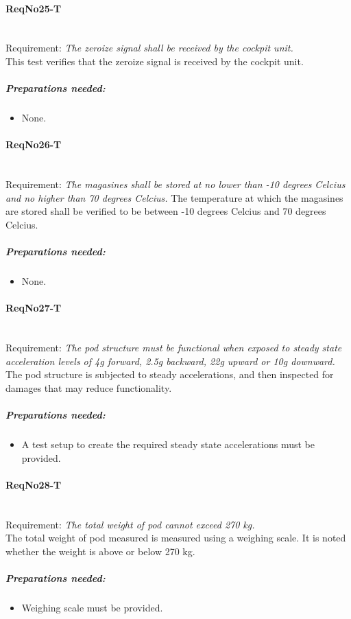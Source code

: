 \paragraph{ReqNo25-T}\mbox{}\\ %
Requirement: \textit{The zeroize signal shall be received by the cockpit unit.}\\

This test verifies that the zeroize signal is received by the cockpit unit.
	\subparagraph{Preparations needed:}
	\begin{itemize}
	\item None.
	\end{itemize}

\paragraph{ReqNo26-T}\mbox{}\\ %
Requirement: \textit{The magasines shall be stored at no lower than -10 degrees Celcius and no higher than 70 degrees Celcius.}
The temperature at which the magasines are stored shall be verified to be between -10 degrees Celcius and 70 degrees Celcius.

	\subparagraph{Preparations needed:}
	\begin{itemize}
	\item None.
	\end{itemize}

\paragraph{ReqNo27-T}\mbox{}\\ %
Requirement: \textit{The pod structure must be functional when exposed to steady state acceleration levels of 4g forward, 2.5g backward, 22g upward or 10g downward.}
\\
The pod structure is subjected to steady accelerations, and then inspected for damages that may reduce functionality.

\subparagraph{Preparations needed:}
	\begin{itemize}
	\item A test setup to create the required steady state accelerations must be provided.
	\end{itemize} 
	

\paragraph{ReqNo28-T}\mbox{}\\ %
Requirement: \textit{The total weight of pod cannot exceed 270 kg.}
\\
The total weight of pod measured is measured using a weighing scale. It is noted whether the weight is above or below 270 kg.
\\
	\subparagraph{Preparations needed:}
	\begin{itemize}
	\item Weighing scale must be provided.
	\end{itemize} 

